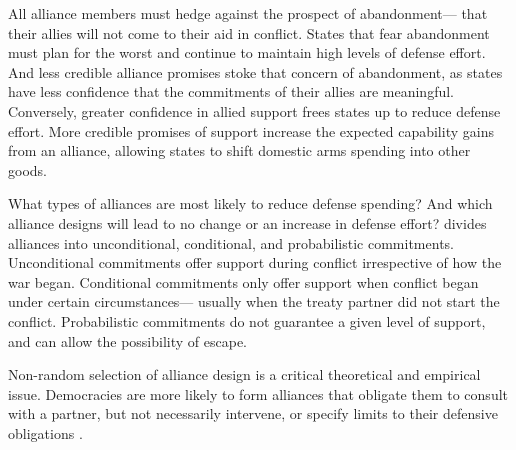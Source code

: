 \documentclass[12pt]{article}
\begin{document}
All alliance members must hedge against the prospect of abandonment--- that their allies will not come to their aid in conflict. States that fear abandonment must plan for the worst and continue to maintain high levels of defense effort. And less credible alliance promises stoke that concern of abandonment, as states have less confidence that the commitments of their allies are meaningful. Conversely, greater confidence in allied support frees states up to reduce defense effort. More credible promises of support increase the expected capability gains from an alliance, allowing states to shift domestic arms spending into other goods. 

What types of alliances are most likely to reduce defense spending? And which alliance designs will lead to no change or an increase in defense effort? \citet{Benson2011, Benson2012} divides alliances into unconditional, conditional, and probabilistic commitments. Unconditional commitments offer support during conflict irrespective of how the war began. Conditional commitments only offer support when conflict began under certain circumstances--- usually when the treaty partner did not start the conflict. Probabilistic commitments do not guarantee a given level of support, and can allow the possibility of escape. 

Non-random selection of alliance design is a critical theoretical and empirical issue. 
Democracies are more likely to form alliances that obligate them to consult with a partner, but not necessarily intervene, or specify limits to their defensive obligations \citep{Chibaetal2015}.










  
% 
\end{document}
